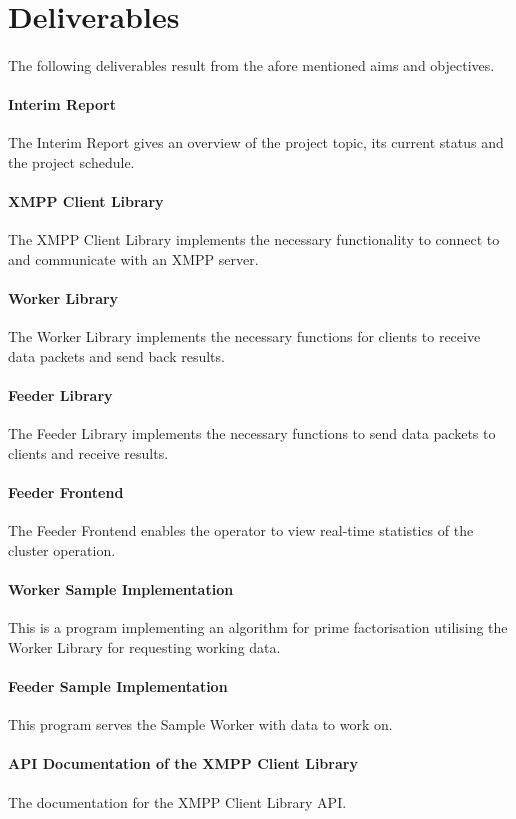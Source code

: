 \section{Deliverables}
\paragraph{}
The following deliverables result from the afore mentioned aims and objectives.

\paragraph{Interim Report} The Interim Report gives an overview of the project topic, its current status and the project schedule.
\paragraph{XMPP Client Library} The XMPP Client Library implements the necessary functionality to connect to and communicate with an XMPP server.
\paragraph{Worker Library} The Worker Library implements the necessary functions for clients to receive data packets and send back results.
\paragraph{Feeder Library} The Feeder Library implements the necessary functions to send data packets to clients and receive results.
\paragraph{Feeder Frontend} The Feeder Frontend enables the operator to view real-time statistics of the cluster operation.
\paragraph{Worker Sample Implementation} This is a program implementing an algorithm for prime factorisation utilising the Worker Library for requesting working data.
\paragraph{Feeder Sample Implementation} This program serves the Sample Worker with data to work on.
\paragraph{API Documentation of the XMPP Client Library} The documentation for the XMPP Client Library API.
